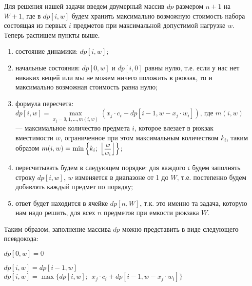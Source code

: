 \documentclass[12pt, a4paper]{article}
\begin{document}
	Для решения нашей задачи введем двумерный массив $dp$ размером $n+1$ на $W+1$, где в $dp[i, w]$ будем хранить максимально возможную стоимость набора состоящая из первых $i$ предметов при максимальной допустимой нагрузке $w$. Теперь распишем пункты выше.
	\begin{enumerate}
		\item состояние динамики: $dp[i, w]$;
		\item начальные состояния: $dp[0, w]$ и $dp[i, 0]$ равны нулю, т.е. если у нас нет никаких вещей или мы не можем ничего положить в рюкзак, то и максимально возможная стоимость равна нулю;
		\item формула пересчета: $dp[i, w] = \!\max\limits_{x_j = 0,1,\dots, m(i,w)} \left(x_j\cdot c_i + dp[i-1, w - x_j\cdot w_i]\right)$, где \linebreak $m(i, w)$ --- максимальное количество предмета $i$, которое влезает в рюкзак вместимости $w$, ограниченное при этом максимальным количеством $k_i$, таким образом $m(i, w) = \min\left\{k_i;\; \left\lfloor\hbox{\footnotesize$\displaystyle\frac{w}{w_i}$}\right\rfloor\right\}$;
		\item пересчитывать будем в следующем порядке: для каждого $i$ будем заполнять строку $dp[i, w]$, $w$ изменяется в диапазоне от 1 до $W$, т.е. постепенно будем добавлять каждый предмет по порядку;
		\item ответ будет находится в ячейке $dp[n, W]$, т.к. это именно та задача, которую нам надо решить, для всех $n$ предметов при емкости рюкзака $W$.
	\end{enumerate}
	
	Таким образом, заполнение массива $dp$ можно представить в виде следующего псевдокода:
	\begin{algorithmic}[1]
		\State $dp[0, w] = 0$
		\EndFor
		
		\State $dp[i, w] = dp[i-1, w]$
		\State $dp[i, w] = \max\Big\{dp[i, w];\;\, x_j\cdot c_i + dp[i-1, w - x_j\cdot w_i]\Big\}$
		\EndFor
		\EndFor
		\EndFor
	\end{algorithmic}
	
	
\end{document}
